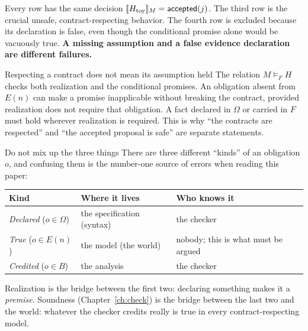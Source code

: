 Every row has the same decision $\llbracket H_{\mathrm{toy}}\rrbracket_{M}=\mathsf{accepted}(j)$. The third row is the crucial unsafe, contract-respecting behavior. The fourth row is excluded because its declaration is false, even though the conditional promise alone would be vacuously true. \textbf{A missing assumption and a false evidence declaration are different failures.}

\begin{warning}{Respecting a contract does not mean its assumption held}
The relation $M\models_F H$ checks both realization and the conditional promises. An obligation absent from $E(n)$ can make a promise inapplicable without breaking the contract, provided realization does not require that obligation. A fact declared in $\Omega$ or carried in $F$ must hold wherever realization is required. This is why ``the contracts are respected'' and ``the accepted proposal is safe'' are separate statements.
\end{warning}


\begin{warning}{Do not mix up the three things}
There are three different ``kinds'' of an obligation $o$, and confusing them is the number-one source of errors when reading this paper:
\begin{center}
\renewcommand{\arraystretch}{1.25}
\begin{tabular}{@{}lll@{}}
\toprule
\textbf{Kind} & \textbf{Where it lives} & \textbf{Who knows it}\\
\midrule
\emph{Declared} ($o\in\Omega$) & the specification (syntax) & the checker\\
\emph{True} ($o\in E(n)$) & the model (the world) & nobody; this is what must be argued\\
\emph{Credited} ($o\in B$) & the analysis & the checker\\
\bottomrule
\end{tabular}
\end{center}
Realization is the bridge between the first two: declaring something makes it a \emph{premise}. Soundness (Chapter~\ref{ch:check}) is the bridge between the last two and the world: whatever the checker credits really is true in every contract-respecting model.
\end{warning}

